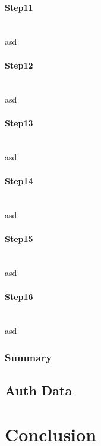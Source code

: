 \documentclass[a4paper, 11pt]{scrartcl}
\begin{document}
\paragraph{Step11}\hfill \\ 
asd
\paragraph{Step12}\hfill \\ 
asd
\paragraph{Step13}\hfill \\ 
asd
\paragraph{Step14}\hfill \\ 
asd
\paragraph{Step15}\hfill \\ 
asd
\paragraph{Step16}\hfill \\ 
asd
\subsubsection{Summary}

\subsection{Auth Data}
\label{sec:authData}


\section{Conclusion}



\clearpage

\printglossaries

\clearpage

\printbibliography[heading=bibintoc]
\end{document}
